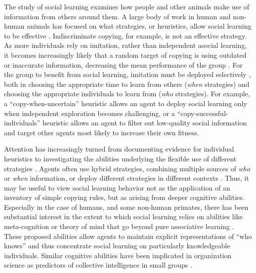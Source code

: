 \documentclass[12pt,letterpaper]{article}
\begin{document}
The study of social learning examines how people and other animals make use of information from others around them.
A large body of work in human and non-human animals has focused on what strategies, or heuristics, allow social learning to be effective \cite{laland_social_2004,hoppitt2013social,RendellFogarty___Laland11_CognitiveCulture,laland2017darwin}. 
Indiscriminate copying, for example, is not an effective strategy. 
As more individuals rely on imitation, rather than independent asocial learning, it becomes increasingly likely that a random target of copying is using outdated or inaccurate information, decreasing the mean performance of the group \cite{rogers_does_1988}.
For the group to benefit from social learning, imitation must be deployed selectively \cite{kameda2003does,boyd1995does,kendal2005trade}, both in choosing the appropriate time to learn from others (\emph{when} strategies) and choosing the appropriate individuals to learn from (\emph{who} strategies). 
For example, a ``copy-when-uncertain'' heuristic allows an agent to deploy social learning only when independent exploration becomes challenging, or a ``copy-successful-individuals'' heuristic allows an agent to filter out low-quality social information and target other agents most likely to increase their own fitness.

Attention has increasingly turned from documenting evidence for individual heuristics to investigating the abilities underlying the flexible use of different strategies \cite{heyes2016blackboxing,kendal2018social}. 
Agents often use hybrid strategies, combining multiple sources of \emph{who} or \emph{when} information, or deploy different strategies in different contexts \cite{mcelreath_beyond_2008}.
Thus, it may be useful to view social learning behavior not as the application of an inventory of simple copying rules, but as arising from deeper cognitive abilities.
Especially in the case of humans, and some non-human primates, there has been substantial interest in the extent to which social learning relies on abilities like meta-cognition \cite{heyes2016knows} or theory of mind \cite{shafto2012learning} that go beyond pure associative learning \cite{behrens2008associative,heyes_whats_2012,heyes2012simple}.
These proposed abilities allow agents to maintain explicit representations of ``who knows'' and thus concentrate social learning on particularly knowledgeable individuals.
Similar cognitive abilities have been implicated in organization science as predictors of collective intelligence in small groups \cite{woolley2010evidence,engel2014reading}.
\end{document}
